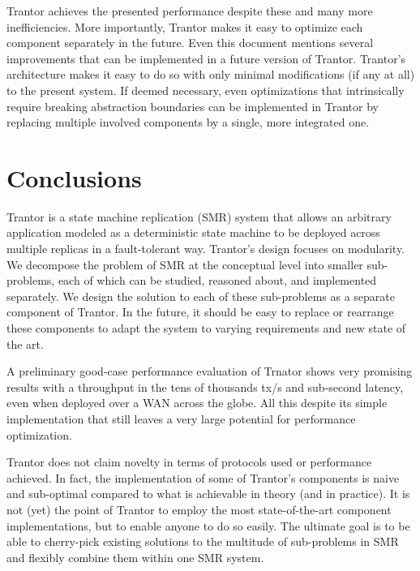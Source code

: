 \documentclass{article}
\begin{document}
Trantor achieves the presented performance despite these and many more inefficiencies.
More importantly, Trantor makes it easy to optimize each component separately in the future.
Even this document mentions several improvements that can be implemented in a future version of Trantor.
Trantor's architecture makes it easy to do so with only minimal modifications (if any at all) to the present system.
If deemed necessary, even optimizations that intrinsically require breaking abstraction boundaries
can be implemented in Trantor by replacing multiple involved components by a single, more integrated one.

\section{Conclusions}
\label{sec:conclusions}

Trantor is a state machine replication (SMR) system that allows an arbitrary application modeled as a deterministic state machine
to be deployed across multiple replicas in a fault-tolerant way.
Trantor’s design focuses on modularity.
We decompose the problem of SMR at the conceptual level into smaller sub-problems, each of which can be studied, reasoned about, and implemented separately.
We design the solution to each of these sub-problems as a separate component of Trantor.
In the future, it should be easy to replace or rearrange these components to adapt the system to varying requirements and new state of the art.

A preliminary good-case performance evaluation of Trnator shows very promising results
with a throughput in the tens of thousands tx/s and sub-second latency,
even when deployed over a WAN across the globe.
All this despite its simple implementation that still leaves a very large potential for performance optimization.

Trantor does not claim novelty in terms of protocols used or performance achieved.
In fact, the implementation of some of Trantor’s components is naive and sub-optimal compared to what is achievable in theory (and in practice).
It is not (yet) the point of Trantor to employ the most state-of-the-art component implementations, but to enable anyone to do so easily.
The ultimate goal is to be able to cherry-pick existing solutions to the multitude of sub-problems in SMR and flexibly combine them within one SMR system.

\newpage



\end{document}
